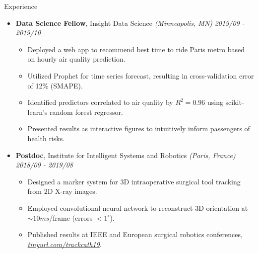 \documentclass{resume} %
\begin{document}
\begin{rSection}{Experience}
	
	\begin{itemize}
	\item {\bf Data Science Fellow}{, Insight Data Science \textit{(Minneapolis, MN)}} \hfill {\em 2019/09 - 2019/10}\\
	\vspace{-5mm}
	\begin{itemize}
		\setlength\itemsep{-1.75em}
		\item Deployed a web app to recommend best time to ride Paris metro based on hourly air quality prediction.\\
		\item Utilized Prophet for time series forecast, resulting in cross-validation error of 12\% (SMAPE).\\
		\item Identified predictors correlated to air quality by $R^2 = 0.96$ using scikit-learn's random forest regressor.\\
		\item Presented results as interactive figures to intuitively inform passengers of health risks.
	\end{itemize}	
	
	\item {\bf Postdoc}{, Institute for Intelligent Systems and Robotics \textit{(Paris, France)}} \hfill {\em 2018/09 - 2019/08}\\
	\vspace{-5mm}
	\begin{itemize}
		\setlength\itemsep{-1.75em}
		\item  Designed a marker system for 3D intraoperative surgical tool tracking from 2D X-ray images.\\ 
		\item  Employed convolutional neural network to reconstruct 3D orientation at $\sim 10 ms$/frame (errors $< 1 ^\circ$).\\
		\item  Published results at IEEE and European surgical robotics conferences, \textit{\href{tinyurl.com/trackcath19}{tinyurl.com/trackcath19}}.
	\end{itemize}
	

\end{itemize}
\end{rSection}
\end{document}
